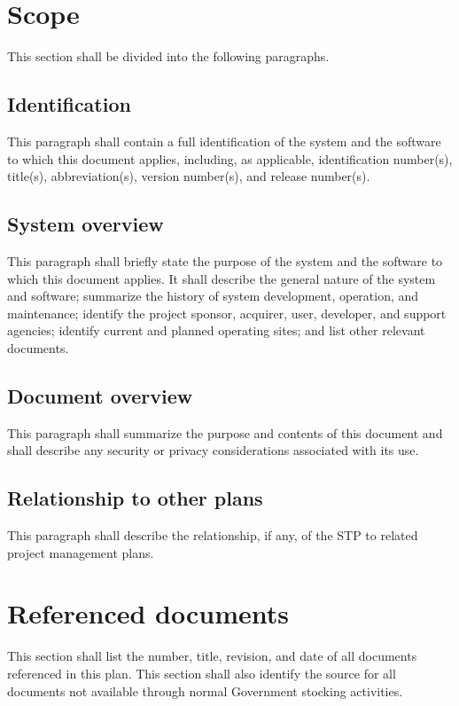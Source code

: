 \documentclass{fidata-report-template}
\begin{document}
\section{Scope}

This section shall be divided into the following paragraphs.

\subsection{Identification}

This paragraph shall contain a full identification of the system and the
software to which this document applies, including, as applicable,
identification number(s), title(s), abbreviation(s), version number(s),
and release number(s).

\subsection{System overview}

This paragraph shall briefly state the purpose of the system and the
software to which this document applies. It shall describe the general
nature of the system and software; summarize the history of system
development, operation, and maintenance; identify the project sponsor,
acquirer, user, developer, and support agencies; identify current and
planned operating sites; and list other relevant documents.

\subsection{Document overview}

This paragraph shall summarize the purpose and contents of this document
and shall describe any security or privacy considerations associated
with its use.

\subsection{Relationship to other plans}

This paragraph shall describe the relationship, if any, of the STP to
related project management plans.

\section{Referenced documents}

This section shall list the number, title, revision, and date of all
documents referenced in this plan. This section shall also identify the
source for all documents not available through normal Government
stocking activities.
\end{document}

